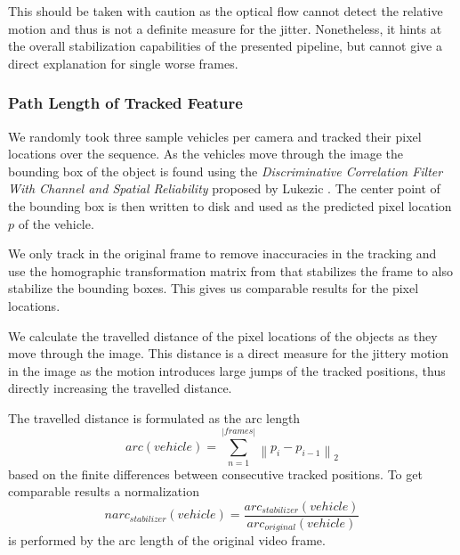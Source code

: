 This should be taken with caution as the optical flow cannot detect the relative motion and thus is not a definite measure for the jitter.
Nonetheless, it hints at the overall stabilization capabilities of the presented pipeline, but cannot give a direct explanation for single worse frames.



\subsubsection{Path Length of Tracked Feature}
We randomly took three sample vehicles per camera and tracked their pixel locations over the sequence.
As the vehicles move through the image the bounding box of the object is found using the \emph{Discriminative Correlation Filter With Channel and Spatial Reliability} proposed by Lukezic \etal{} \cite{Lukezic_2017_CVPR,opencv_library}.
The center point of the bounding box is then written to disk and used as the predicted pixel location $p$ of the vehicle.

We only track in the original frame to remove inaccuracies in the tracking and use the homographic transformation matrix from  that stabilizes the frame to also stabilize the bounding boxes.
This gives us comparable results for the pixel locations. 

We calculate the travelled distance of the pixel locations of the objects as they move through the image. 
This distance is a direct measure for the jittery motion in the image as the motion introduces large jumps of the tracked positions, thus directly increasing the travelled distance.

The travelled distance is formulated as the arc length
\begin{equation}
    arc(vehicle) = \sum_{n = 1}^{\left\lvert frames \right\rvert } \left\lVert 
        p_{i} - p_{i-1}
    \right\rVert _2
\end{equation} 
based on the finite differences between consecutive tracked positions.
To get comparable results a normalization 
\begin{equation}
    narc_{stabilizer}(vehicle) = 
    \frac{arc_{stabilizer}(vehicle)}{arc_{original}(vehicle)}
\end{equation} 
is performed by the arc length of the original video frame.

